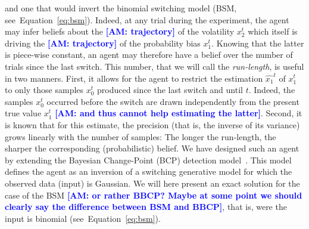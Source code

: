 \documentclass[12pt,english]{article}%
\newcommand{\citep}[1]{\parencite{#1}}
\newcommand{\seeEq}[1]{Equation~\ref{eq:#1}}
\newcommand{\AM}[1]{\textbf{\textcolor{blue}{[AM: #1]}}}
\begin{document}
and one that would invert the binomial switching model (BSM, see~\seeEq{bsm}).
Indeed, at any trial during the experiment, 
the agent may infer beliefs about the \AM{trajectory} of the volatility $x_2^t$
which itself is driving the \AM{trajectory} of the probability bias $x_1^t$.
Knowing that the latter is piece-wise constant,
an agent may therefore have a belief over the number of trials since the last switch.
This number, that we will call the \emph{run-length}, is useful in two manners. 
First, it allows for the agent to restrict the estimation $\hat{x_1}^{t}$ of $x_1^t$ 
to only those samples $x_0^t$ produced since the last switch and until $t$.
Indeed, the samples $x_0^t$ occurred before the switch are drawn independently from the present true value $x_1^t$ \AM{and thus cannot help estimating the latter}.
Second, it is known that for  this estimate, the precision 
(that is, the inverse of its variance)
grows linearly with the number of samples:
The longer the run-length, the sharper the corresponding (probabilistic) belief.
We have designed such an agent by extending 
the Bayesian Change-Point (BCP) detection model~\citep{AdamsMackay2007}.
This model defines the agent as an inversion of a switching generative model 
for which the observed data (input) is Gaussian.
We will here present an exact solution for the case of the BSM \AM{or rather BBCP? Maybe at some point we should clearly say the difference between BSM and BBCP},
that is, were the input is binomial (see~\seeEq{bsm}). 
\end{document}
